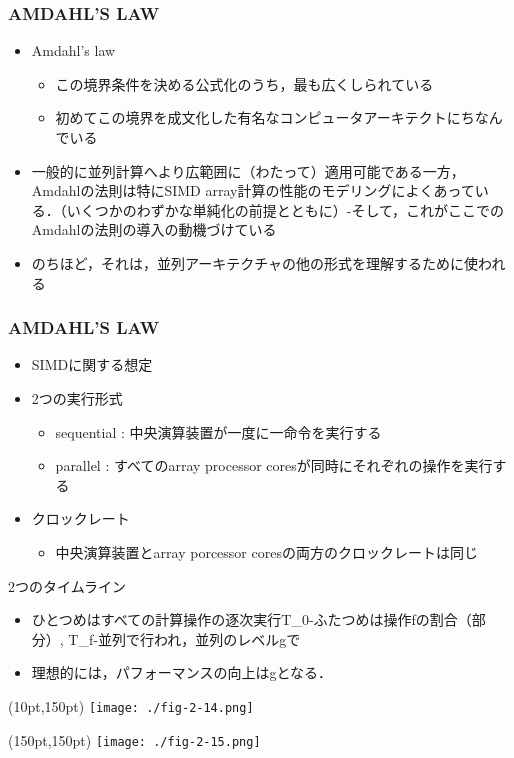 \documentclass[12pt, unicode, dvipdfmx, t]{beamer}
\begin{document}
\begin{frame}[t]
	\frametitle{AMDAHL'S LAW}
	\begin{itemize}
		\item Amdahl's law
		\begin{itemize}
			\item この境界条件を決める公式化のうち，最も広くしられている
			\item 初めてこの境界を成文化した有名なコンピュータアーキテクトにちなんでいる
		\end{itemize}
	\item 一般的に並列計算へより広範囲に（わたって）適用可能である一方，Amdahlの法則は特にSIMD array計算の性能のモデリングによくあっている．（いくつかのわずかな単純化の前提とともに）-そして，これがここでのAmdahlの法則の導入の動機づけている
	\item のちほど，それは，並列アーキテクチャの他の形式を理解するために使われる
	\end{itemize}
\end{frame}

\begin{frame}[t]
	\frametitle{AMDAHL'S LAW}
	\begin{itemize}
		\item SIMDに関する想定
		\item 2つの実行形式
		\begin{itemize}
			\item sequential : 中央演算装置が一度に一命令を実行する
			\item parallel : すべてのarray processor coresが同時にそれぞれの操作を実行する
		\end{itemize}
	\item クロックレート
		\begin{itemize}
			\item 中央演算装置とarray porcessor coresの両方のクロックレートは同じ
		\end{itemize}
	\end{itemize}
\end{frame}

\begin{frame}[t]
	2つのタイムライン
	\begin{itemize}
		\item ひとつめはすべての計算操作の逐次実行T\_0-ふたつめは操作fの割合（部分）, T\_f-並列で行われ，並列のレベルgで
		\item 理想的には，パフォーマンスの向上はgとなる．
	\end{itemize}
	\begin{textblock*}{0.5\linewidth}(10pt,150pt)
		\centering
		\texttt{[image: ./fig-2-14.png]}
	\end{textblock*}
	\begin{textblock*}{0.5\linewidth}(150pt,150pt)
		\centering
		\texttt{[image: ./fig-2-15.png]}
	\end{textblock*}
\end{frame}
\end{document}
